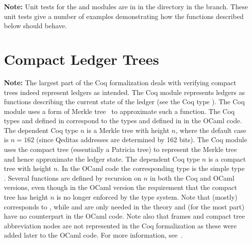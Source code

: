 
{\bf{Note:}} Unit tests for the {} and {} modules are in {}
in the {}
directory in the {} branch.
These unit tests give a number of examples demonstrating how the functions described below should behave.

\section{Compact Ledger Trees}


{\bf{Note:}} The largest part of the Coq formalization deals with verifying compact trees
indeed represent ledgers as intended.
The Coq module {} represents ledgers as functions
describing the current state of the ledger (see the Coq type ).
The Coq module {} uses a form of Merkle tree~\cite{Merkle1980} to approximate such a
{} function.
The Coq types {} and {} defined in {} correspond to 
the types {} and {} defined in {} in the OCaml code.
The dependent Coq type {} $n$ is a Merkle tree with height $n$,
where the default case is $n=162$ (since Qeditas addresses are determined by 162 bits).
The Coq module {} uses the compact tree (essentially a Patricia tree)
to represent the Merkle tree and hence approximate the ledger state.
The dependent Coq type {} $n$ is a compact tree with height $n$.
In the OCaml code the corresponding type is the simple type {}.
Several functions are defined by recursion on $n$ in both the Coq and OCaml versions,
even though in the OCaml version the requirement that the compact tree has height $n$
is no longer enforced by the type system.
Note that {} (mostly) corresponds to {},
while {} and {} are only needed in the theory
and (for the most part) have no counterpart in the OCaml code.
Note also that frames and compact tree abbreviation nodes are not
represented in the Coq formalization as these were added later to the
OCaml code.
For more information, see~\cite{White2015b}.


